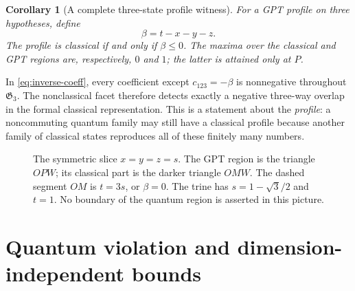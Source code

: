 \documentclass[10pt,a4paper]{amsart}
\newtheorem{corollary}[theorem]{Corollary}
\newcommand{\1}{\mathbf 1}
\newcommand{\Creg}{\mathfrak C}
\newcommand{\Greg}{\mathfrak G}
\begin{document}
\begin{corollary}[A complete three-state profile witness]\label{cor:unique-facet}
For a GPT profile on three hypotheses, define
\begin{equation}\label{eq:beta}
 \beta=t-x-y-z.
\end{equation}
The profile is classical if and only if $\beta\le0$. The maxima over the
classical and GPT regions are, respectively, $0$ and $1$; the latter is
attained only at $P$.
\end{corollary}

In \eqref{eq:inverse-coeff}, every coefficient except $c_{123}=-\beta$ is
nonnegative throughout $\Greg_3$. The nonclassical facet therefore detects
exactly a negative three-way overlap in the formal classical representation.
This is a statement about the \emph{profile}: a noncommuting quantum family may
still have a classical profile because another family of classical states
reproduces all of these finitely many numbers.

\begin{figure}[t]
\centering
{}
\caption{The symmetric slice $x=y=z=s$. The GPT region is the triangle $OPW$;
its classical part is the darker triangle $OMW$. The dashed segment $OM$ is
$t=3s$, or $\beta=0$. The trine has $s=1-\sqrt3/2$ and $t=1$.
No boundary of the quantum region is asserted in this picture.}
\label{fig:slice}
\end{figure}

\section{Quantum violation and dimension-independent bounds}\label{sec:quantum}
\end{document}
